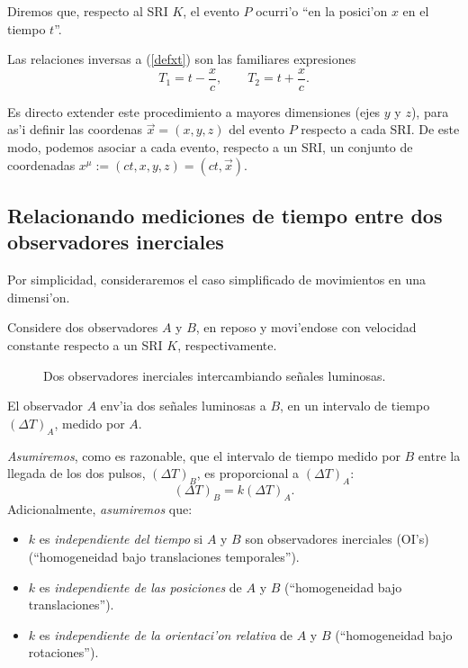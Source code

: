 Diremos que, respecto al SRI $K$, el evento $P$ ocurri'o ``en la posici'on $x$ en el tiempo $t$''.

Las relaciones inversas a (\ref{defxt}) son las familiares expresiones
\begin{equation}\label{T1T2xt}
T_1=t-\frac{x}{c}, \qquad T_2=t+\frac{x}{c}.
\end{equation}


Es directo extender este procedimiento a mayores dimensiones (ejes $y$ y $z$), para as'i definir las coordenas $\vec{x}=(x,y,z)$ del evento $P$ respecto a cada SRI.
De este modo, podemos asociar a cada evento, respecto a un SRI, un conjunto de
coordenadas $x^\mu:=\left(ct,x,y,z\right)=(ct,\vec{x}) $.


\subsection{Relacionando mediciones de tiempo entre dos observadores inerciales}

Por simplicidad, consideraremos el caso simplificado de movimientos en
una dimensi'on.

Considere dos observadores $A$ y $B$, en reposo y movi'endose con
velocidad constante respecto a un SRI $K$, respectivamente.
\begin{figure}[H]
\centerline{}
 \caption{Dos observadores inerciales intercambiando se\~nales luminosas.}
\label{k1}
\end{figure}
El observador $A$ env'ia dos se\~nales luminosas a $B$, en un intervalo de tiempo $(\Delta T)_A$, medido por $A$.

\textit{Asumiremos}, como es razonable, que el intervalo de tiempo medido por $B$ entre la llegada
de los dos pulsos, $(\Delta T)_B$, es proporcional a $(\Delta T)_A$:
\begin{equation}
(\Delta T)_B=k (\Delta T)_A. \label{TAkTB}
\end{equation}
Adicionalmente, \textit{asumiremos} que:
\begin{itemize}
\item $k$ es \textit{independiente del tiempo} si $A$ y $B$ son observadores inerciales (OI's) (``homogeneidad bajo
translaciones temporales'').
\item $k$ es \textit{independiente de las posiciones} de $A$ y $B$ (``homogeneidad bajo translaciones'').
\item $k$ es \textit{independiente de la orientaci'on relativa} de $A$ y $B$ (``homogeneidad bajo rotaciones'').
\end{itemize}

